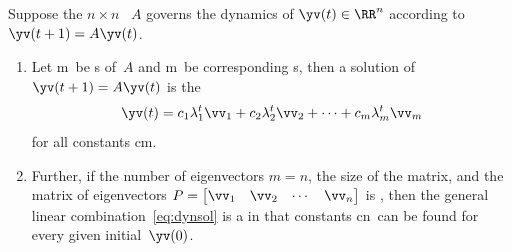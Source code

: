 \begin{theorem} \label{thm:dynsol}
Suppose the \(n\times n\) ~\(A\) governs the dynamics of \(\yv(t)\in\RR^n\) according to \(\yv(t+1)=A\yv(t)\).
\begin{enumerate}
\item\label{thm:dynsola} Let \hlist\lambda m\ be s of~\(A\) and \hlist\vv m\ be corresponding s, then a solution of \(\yv(t+1)=A\yv(t)\) is the 
\begin{equation}
\yv(t)=c_1\lambda_1^t\vv_1+c_2\lambda_2^t\vv_2+\cdots+c_m\lambda_m^t\vv_m
\label{eq:dynsol}
\end{equation}
for all constants \hlist cm.

\item\label{thm:dynsolb} Further, if the number of eigenvectors \(m=n\), the size of the matrix, and the matrix of eigenvectors \(P=\begin{bmatrix} \vv_1&\vv_2&\cdots&\vv_n \end{bmatrix}\) is , then the general linear combination~\eqref{eq:dynsol} is a  in that constants \hlist cn\ can be found for every given initial~\(\yv(0)\).
\end{enumerate}
\end{theorem}

